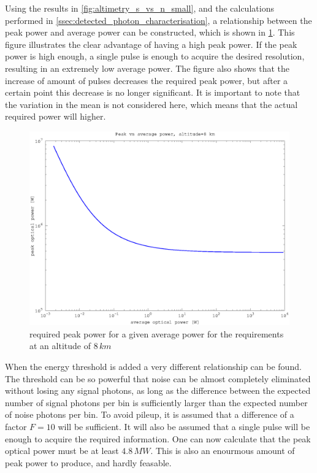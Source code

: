

Using the results in \cref{fig:altimetry_s_vs_n_small}, and the calculations performed in \cref{ssec:detected_photon_characterisation}, a relationship between the peak power and average power can be constructed, which is shown in \cref{fig:peak_vs_av}. This figure illustrates the clear advantage of having a high peak power. If the peak power is high enough, a single pulse is enough to acquire the desired resolution, resulting in an extremely low average power. The figure also shows that the increase of amount of pulses decreases the required peak power, but after a certain point this decrease is no longer significant. It is important to note that the variation in the mean is not considered here, which means that the actual required power will higher.

\begin{figure}[h]
\centering
	\includegraphics[width=0.8\linewidth]{fig/peak_vs_av.eps}
\caption{required peak power for a given average power for the requirements at an altitude of $8\,km$}
\label{fig:peak_vs_av}
\end{figure}

When the energy threshold is added a very different relationship can be found. The threshold can be so powerful that noise can be almost completely eliminated without losing any signal photons, as long as the difference between the expected number of signal photons per bin is sufficiently larger than the expected number of noise photons per bin. To avoid pileup, it is assumed that a difference of a factor $F=10$ will be sufficient. It will also be assumed that a single pulse will be enough to acquire the required information. One can now calculate that the peak optical power must be at least $4.8\,MW$. This is also an enourmous amount of peak power to produce, and hardly feasable.


